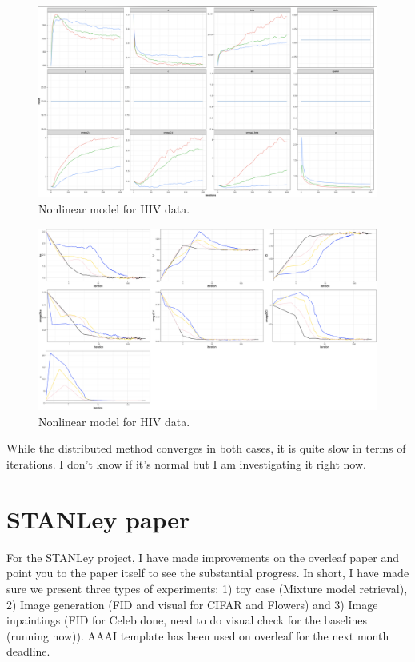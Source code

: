 \documentclass{article}
\begin{document}
\begin{figure}[h]
\centering
\includegraphics[width=\textwidth]{fig/hiv-dist}
\caption{Nonlinear model for HIV data.}
\label{fig:hiv}
\end{figure}


\begin{figure}[h]
\centering
\includegraphics[width=\textwidth]{fig/pk-dist}
\caption{Nonlinear model for HIV data.}
\label{fig:hiv}
\end{figure}

While the distributed method converges in both cases, it is quite slow in terms of iterations. I don't know if it's normal but I am investigating it right now.

\section{STANLey paper}

For the STANLey project, I have made improvements on the overleaf paper and point you to the paper itself to see the substantial progress.
In short, I have made sure we present three types of experiments: 1) toy case (Mixture model retrieval), 2) Image generation (FID and visual for CIFAR and Flowers) and 3) Image inpaintings (FID for Celeb done, need to do visual check for the baselines (running now)).
AAAI template has been used on overleaf for the next month deadline.




\end{document}

